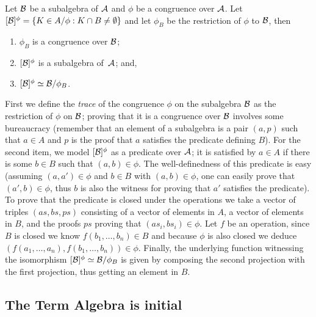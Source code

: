 \begin{theorem} Let $\mathcal{B}$ be a
subalgebra of $\mathcal{A}$ and $\phi$ be a congruence over $\mathcal{A}$. Let
$[\mathcal{B}]^{\phi}=\{K \in A / \phi : K \cap B \not= \emptyset\}$ and
let $\phi_B$ be the restriction of $\phi$ to $\mathcal{B}$, then
\begin{enumerate}
\item$\phi_B$ is a congruence over $\mathcal{B}$;
\item$[\mathcal{B}]^{\phi}$ is a subalgebra of~$\mathcal{A}$; and,
\item$[\mathcal{B}]^{\phi} \simeq \mathcal{B} / \phi_B$.
\end{enumerate}
\end{theorem}
\noindent First we define the \emph{trace} of the congruence $\phi$ on
the subalgebra $\mathcal{B}$ as the restriction of $\phi$ on $\mathcal{B}$;
proving that it is a congruence over $\mathcal{B}$ involves some
bureaucracy (remember that an element of a subalgebra is a pair
$(a, p)$ such that $a \in A$ and $p$ is the proof that $a$ satisfies
the predicate defining $B$). For the second item, we model
$[\mathcal{B}]^{\phi}$ as a predicate over $\mathcal{A}$; it is satisfied by
$a \in A$ if there is some $b \in B$ such that $(a,b) \in \phi$. The
well-definedness of this predicate is easy (assuming $(a,a') \in \phi$
and $b\in B$ with $(a,b) \in \phi$, one can easily prove that
$(a',b) \in \phi$, thus $b$ is also the witness for proving that $a'$
satisfies the predicate). To prove that the predicate is closed under
the operations we take a vector of triples $(as,bs,ps)$ consisting of
a vector of elements in $A$, a vector of elements in $B$, and the
proofs $ps$ proving that $(as_i,bs_i)\in\phi$. Let $f$ be an
operation, since $B$ is closed we know $f(b_1,\ldots,b_n)\in B$ and
because $\phi$ is also closed we deduce
$(f(a_1,\ldots,a_n),f(b_1,\ldots,b_n))\in\phi$. Finally, the
underlying function witnessing the isomorphism
$[\mathcal{B}]^{\phi} \simeq \mathcal{B} / \phi_B$ is given by composing the
second projection with the first projection, thus getting an element
in $B$.

\subsection{The Term Algebra is initial}

